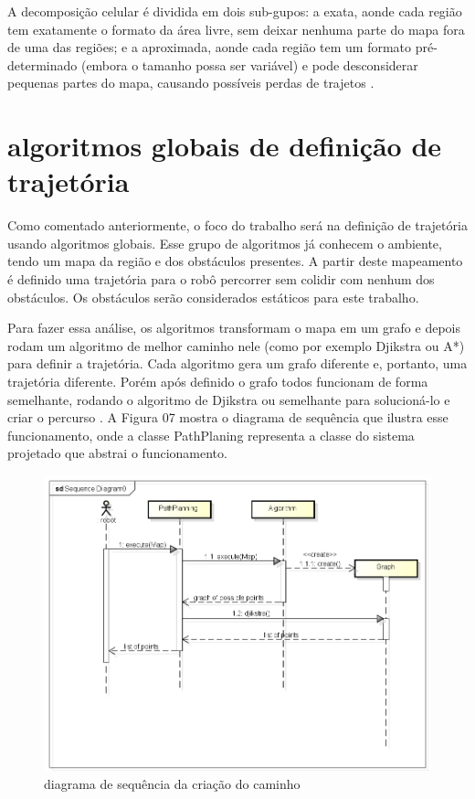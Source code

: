 A decomposição celular é dividida em dois sub-gupos: a exata, aonde cada região tem exatamente o formato da área livre, sem deixar nenhuma parte do mapa fora de uma das regiões; e a aproximada, aonde cada região tem um formato pré-determinado (embora o tamanho possa ser variável) e pode desconsiderar pequenas partes do mapa, causando possíveis perdas de trajetos \cite{Souza2008}.

\section{algoritmos globais de definição de trajetória}

Como comentado anteriormente, o foco do trabalho será na definição de trajetória usando algoritmos globais. Esse grupo de algoritmos já conhecem o ambiente, tendo um mapa da região e dos obstáculos presentes. A partir deste mapeamento é definido uma trajetória para o robô percorrer sem colidir com nenhum dos obstáculos. Os obstáculos serão considerados estáticos para este trabalho.

Para fazer essa análise, os algoritmos transformam o mapa em um grafo e depois rodam um algoritmo de melhor caminho nele (como por exemplo Djikstra ou A*) para definir a trajetória. Cada algoritmo gera um grafo diferente e, portanto, uma trajetória diferente. Porém após definido o grafo todos funcionam de forma semelhante, rodando o algoritmo de Djikstra ou semelhante para solucioná-lo e criar o percurso \cite{Guzman2008}. A Figura 07 mostra o diagrama de sequência que ilustra esse funcionamento, onde a classe PathPlaning representa a classe do sistema projetado que abstrai o funcionamento.

\begin{figure}[h]
	\centering
	\label{fig07}
		\includegraphics[keepaspectratio=true,scale=0.6]{figuras/5diagramaSequencia.png}
	\caption{diagrama de sequência da criação do caminho}
\end{figure}

